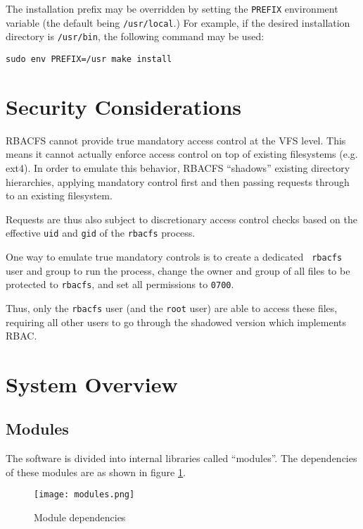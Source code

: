 \documentclass[11pt,oneside,letterpaper]{article}
\begin{document}
The installation prefix may be overridden by setting the {\tt PREFIX}
environment variable (the default being {\tt /usr/local}.) For example,
if the desired installation directory is {\tt /usr/bin}, the following
command may be used:
\begin{lstlisting}
sudo env PREFIX=/usr make install
\end{lstlisting}

\section{Security Considerations}

RBACFS cannot provide true mandatory access control at the VFS level. This
means it cannot actually enforce access control on top of existing filesystems
(e.g. ext4). In order to emulate this behavior, RBACFS ``shadows'' existing
directory hierarchies, applying mandatory control first and then passing
requests through to an existing filesystem.

Requests are thus also subject to discretionary access control checks
based on the effective {\tt uid} and {\tt gid} of the {\tt rbacfs} process.

One way to emulate true mandatory controls is to create a dedicated {\tt
rbacfs} user and group to run the process, change the owner and group of all
files to be protected to {\tt rbacfs}, and set all permissions to {\tt 0700}.

Thus, only the {\tt rbacfs} user (and the {\tt root} user) are able
to access these files, requiring all other users to go through the
shadowed version which implements RBAC.

\section{System Overview}

\subsection{Modules}

The software is divided into internal libraries called ``modules''. The
dependencies of these modules are as shown in figure \ref{fig:modules}.

\begin{figure}[h]
    \centering
    \texttt{[image: modules.png]}
    \label{fig:modules}
    \caption{Module dependencies}
\end{figure}
\end{document}
